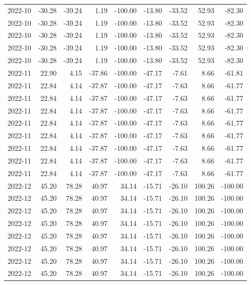 \begin{table}[ht]
\begin{tabular}{lrrrrrrrr}
  2022-10 & -30.28 & -39.24 & 1.19 & -100.00 & -13.80 & -33.52 & 52.93 & -82.30 \\ 
  2022-10 & -30.28 & -39.24 & 1.19 & -100.00 & -13.80 & -33.52 & 52.93 & -82.30 \\ 
  2022-10 & -30.28 & -39.24 & 1.19 & -100.00 & -13.80 & -33.52 & 52.93 & -82.30 \\ 
  2022-10 & -30.28 & -39.24 & 1.19 & -100.00 & -13.80 & -33.52 & 52.93 & -82.30 \\ 
  2022-10 & -30.28 & -39.24 & 1.19 & -100.00 & -13.80 & -33.52 & 52.93 & -82.30 \\ 
  2022-11 & 22.90 & 4.15 & -37.86 & -100.00 & -47.17 & -7.61 & 8.66 & -61.81 \\ 
  2022-11 & 22.84 & 4.14 & -37.87 & -100.00 & -47.17 & -7.63 & 8.66 & -61.77 \\ 
  2022-11 & 22.84 & 4.14 & -37.87 & -100.00 & -47.17 & -7.63 & 8.66 & -61.77 \\ 
  2022-11 & 22.84 & 4.14 & -37.87 & -100.00 & -47.17 & -7.63 & 8.66 & -61.77 \\ 
  2022-11 & 22.84 & 4.14 & -37.87 & -100.00 & -47.17 & -7.63 & 8.66 & -61.77 \\ 
  2022-11 & 22.84 & 4.14 & -37.87 & -100.00 & -47.17 & -7.63 & 8.66 & -61.77 \\ 
  2022-11 & 22.84 & 4.14 & -37.87 & -100.00 & -47.17 & -7.63 & 8.66 & -61.77 \\ 
  2022-11 & 22.84 & 4.14 & -37.87 & -100.00 & -47.17 & -7.63 & 8.66 & -61.77 \\ 
  2022-11 & 22.84 & 4.14 & -37.87 & -100.00 & -47.17 & -7.63 & 8.66 & -61.77 \\ 
  2022-12 & 45.20 & 78.28 & 40.97 & 34.14 & -15.71 & -26.10 & 100.26 & -100.00 \\ 
  2022-12 & 45.20 & 78.28 & 40.97 & 34.14 & -15.71 & -26.10 & 100.26 & -100.00 \\ 
  2022-12 & 45.20 & 78.28 & 40.97 & 34.14 & -15.71 & -26.10 & 100.26 & -100.00 \\ 
  2022-12 & 45.20 & 78.28 & 40.97 & 34.14 & -15.71 & -26.10 & 100.26 & -100.00 \\ 
  2022-12 & 45.20 & 78.28 & 40.97 & 34.14 & -15.71 & -26.10 & 100.26 & -100.00 \\ 
  2022-12 & 45.20 & 78.28 & 40.97 & 34.14 & -15.71 & -26.10 & 100.26 & -100.00 \\ 
  2022-12 & 45.20 & 78.28 & 40.97 & 34.14 & -15.71 & -26.10 & 100.26 & -100.00 \\ 
  2022-12 & 45.20 & 78.28 & 40.97 & 34.14 & -15.71 & -26.10 & 100.26 & -100.00 \\ 

\end{tabular}
\end{table}
